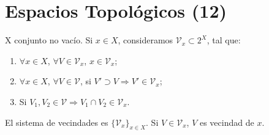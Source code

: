
\section{Espacios Topológicos (12)}

\begin{definition}
	X conjunto no vacío. Si $x\in X$, consideramos $\mathcal{V}_x \subset 2^{X}$, tal que:

	\begin{enumerate}
		\item $\forall x \in X$, $\forall V \in \mathcal{V}_x$, $x \in \mathcal{V}_x$;

		\item $\forall x \in X$, $\forall V \in \mathcal{V}$, si $V' \supset V \Rightarrow V' \in \mathcal{V}_x$;

		\item Si $V_1,V_2 \in \mathcal{V} \Rightarrow V_1 \cap V_2 \in \mathcal{V}_x$.
	\end{enumerate}

	\noindent El sistema de vecindades es $\{ \mathcal{V}_x \}_{x \in X}$. Si $V \in \mathcal{V}_x$, $V$ es vecindad de $x$.  
\end{definition}

